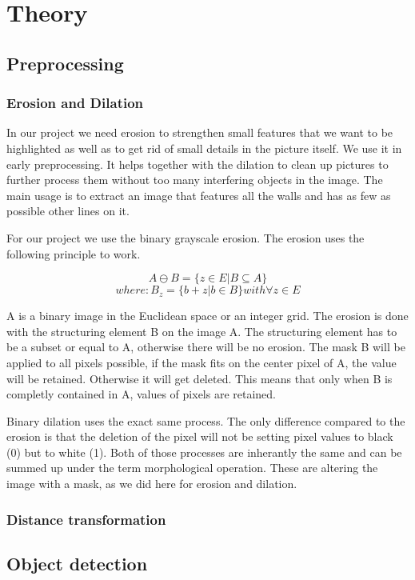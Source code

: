 \section{Theory}
\subsection{Preprocessing}
\subsubsection{Erosion and Dilation}
In our project we need erosion to strengthen small features that we want to be highlighted as well as to get rid of small details in the picture itself. We use it in early preprocessing. It helps together with the dilation to clean up pictures to further process them without too many interfering objects in the image. The main usage is to extract an image that features all the walls and has as few as possible other lines on it.

For our project we use the binary grayscale erosion.
The erosion uses the following principle to work.


\[A \ominus B = \{ z\in E | B \subseteq A \}\]  
\[where: B_{z} = \{b+z | b \in B\} with \forall z \in E \]

A is a binary image in the Euclidean space or an integer grid. The erosion is done with the structuring element B on the image A. The structuring element has to be a subset or equal to A, otherwise there will be no erosion. The mask B will be applied to all pixels possible, if the mask fits on the center pixel of A, the value will be retained. Otherwise it will get deleted. This means that only when B is completly contained in A, values of pixels are retained.

Binary dilation uses the exact same process. The only difference compared to the erosion is that the deletion of the pixel will not be setting pixel values to black (0) but to white (1). Both of those processes are inherantly the same and can be summed up under the term morphological operation. These are altering the image with a mask, as we did here for erosion and dilation.




\subsubsection{Distance transformation}
\subsection{Object detection}
